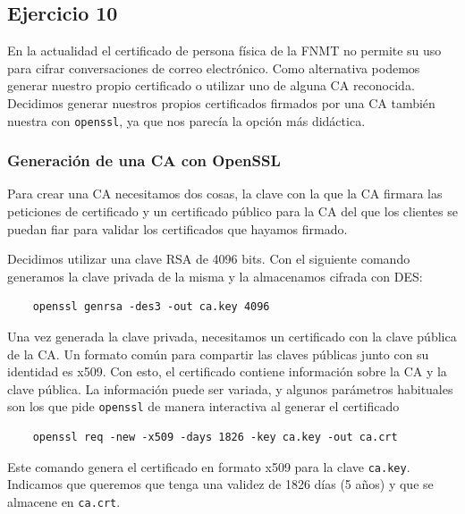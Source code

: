 \subsection{Ejercicio 10}
\graphicspath{ {img/10} }

En la actualidad el certificado de persona física de la FNMT no permite su uso para cifrar conversaciones de correo electrónico. Como alternativa podemos generar nuestro propio certificado o utilizar uno de alguna CA reconocida. Decidimos generar nuestros propios certificados firmados por una CA también nuestra con \texttt{openssl}, ya que nos parecía la opción más didáctica.

\subsubsection{Generación de una CA con OpenSSL}

Para crear una CA necesitamos dos cosas, la clave con la que la CA firmara las peticiones de certificado y un certificado público para la CA del que los clientes se puedan fiar para validar los certificados que hayamos firmado.

Decidimos utilizar una clave RSA de 4096 bits. Con el siguiente comando generamos la clave privada de la misma y la almacenamos cifrada con DES:

\begin{verbatim}
    openssl genrsa -des3 -out ca.key 4096
\end{verbatim}

Una vez generada la clave privada, necesitamos un certificado con la clave pública de la CA. Un formato común para compartir las claves públicas junto con su identidad es x509. Con esto, el certificado contiene información sobre la CA y la clave pública. La información puede ser variada, y algunos parámetros habituales son los que pide \texttt{openssl} de manera interactiva al generar el certificado

\begin{verbatim}
    openssl req -new -x509 -days 1826 -key ca.key -out ca.crt
\end{verbatim}

Este comando genera el certificado en formato x509 para la clave \texttt{ca.key}. Indicamos que queremos que tenga una validez de 1826 días (5 años) y que se almacene en \texttt{ca.crt}.

